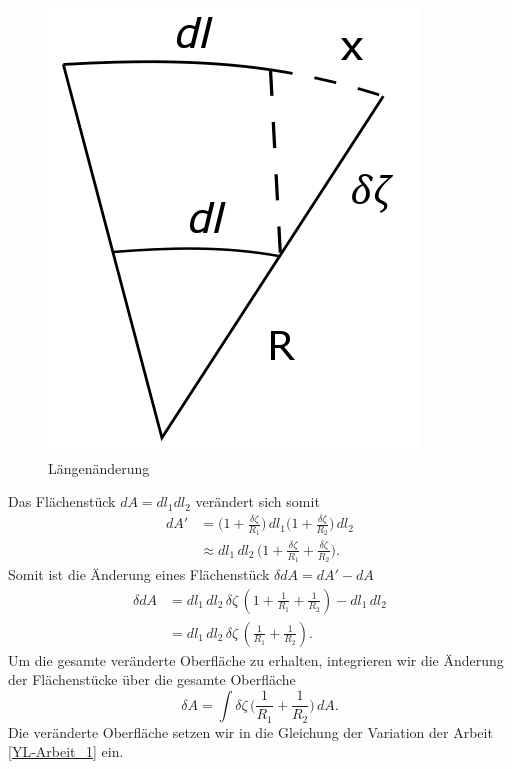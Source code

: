 \begin{refsection}
\begin{figure}
  \includegraphics[scale=0.3]{minimal/Langenanderung2.png}
  \caption{Längenänderung} 
  \label{fig:Strahlensatz}
\end{figure}
Das Flächenstück $dA=dl_1 dl_2$ verändert sich somit
\begin{equation}
\begin{split}
dA' &= \bigg(1+\frac{\delta\zeta}{R_1}\bigg)\, dl_1 \bigg(1+\frac{\delta\zeta}{R_2}\bigg) \, dl_2 \\
&\approx dl_1\,dl_2\,\bigg(1+\frac{\delta\zeta}{R_1} + \frac{\delta\zeta}{R_2}\bigg).
\end{split}
\end{equation} 
Somit ist die Änderung eines Flächenstück $\delta dA=dA'-dA$
\begin{equation}
\begin{split}
\delta dA &= dl_1\,dl_2\,\delta\zeta\,(1+\frac{1}{R_1}+\frac{1}{R_2})-dl_1\,dl_2\\
&= dl_1\,dl_2\,\delta\zeta\,(\frac{1}{R_1}+\frac{1}{R_2}).
\end{split}
\end{equation}
Um die gesamte veränderte Oberfläche zu erhalten, integrieren wir die Änderung der Flächenstücke über die gesamte Oberfläche
\begin{equation}
\delta A = \int \delta\zeta \, \bigg( \frac{1}{R_1}+\frac{1}{R_2} \bigg)\,dA.
\end{equation}
Die veränderte Oberfläche setzen wir in die Gleichung der Variation der Arbeit \ref{YL-Arbeit_1} ein. 

\end{refsection}

